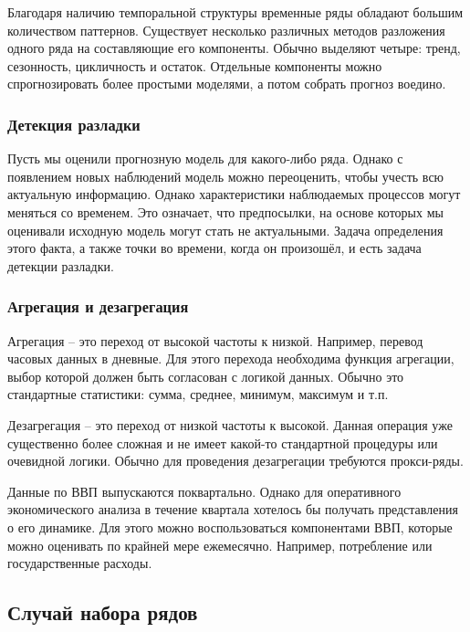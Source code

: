 \documentclass[12pt,fleqn]{article}
\begin{document}
Благодаря наличию темпоральной структуры временные ряды обладают большим количеством паттернов. Существует несколько различных методов разложения одного ряда на составляющие его компоненты. Обычно выделяют четыре: тренд, сезонность, цикличность и остаток. Отдельные компоненты можно спрогнозировать более простыми моделями, а потом собрать прогноз воедино.



\subsubsection{Детекция разладки}

Пусть мы оценили прогнозную модель для какого-либо ряда. Однако с появлением новых наблюдений модель можно переоценить, чтобы учесть всю актуальную информацию. Однако характеристики наблюдаемых процессов могут меняться со временем. Это означает, что предпосылки, на основе которых мы оценивали исходную модель могут стать не актуальными. Задача определения этого факта, а также точки во времени, когда он произошёл, и есть задача детекции разладки.

\subsubsection{Агрегация и дезагрегация}

Агрегация -- это переход от высокой частоты к низкой. Например, перевод часовых данных в дневные. Для этого перехода необходима функция агрегации, выбор которой должен быть согласован с логикой данных. Обычно это стандартные статистики: сумма, среднее, минимум, максимум и т.п.

Дезагрегация -- это переход от низкой частоты к высокой. Данная операция уже существенно более сложная и не имеет какой-то стандартной процедуры или очевидной логики. Обычно для проведения дезагрегации требуются прокси-ряды.

\begin{example}
Данные по ВВП выпускаются поквартально. Однако для оперативного экономического анализа в течение квартала хотелось бы получать представления о его динамике. Для этого можно воспользоваться компонентами ВВП, которые можно оценивать по крайней мере ежемесячно. Например, потребление или государственные расходы. 
\end{example}

\subsection{Случай набора рядов}
\end{document}
